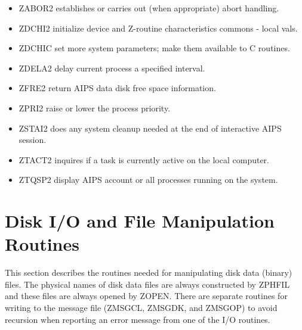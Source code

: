 \begin{itemize} %
\item ZABOR2  establishes or carries out (when
appropriate) abort handling.
\item ZDCHI2  initialize device and Z-routine
characteristics commons - local vals.
\item ZDCHIC  set more system parameters; make them
available to C routines.
\item ZDELA2  delay current process a specified
interval.
\item ZFRE2   return AIPS data disk free space
information.
\item ZPRI2   raise or lower the process priority.
\item ZSTAI2  does any system cleanup needed at the end
of interactive AIPS session.
\item ZTACT2  inquires if a task is currently active on
the local computer.
\item ZTQSP2  display AIPS account or all processes
running on the system.
\end{itemize} %


\section{Disk I/O and File Manipulation Routines }

This section describes the routines needed for manipulating disk data
(binary) files.  The physical names of disk data files are always
constructed by ZPHFIL and these files are always opened by ZOPEN.
There are separate routines for writing to the message file
(ZMSGCL, ZMSGDK, and ZMSGOP)
to avoid recursion when reporting an error message from one of the I/O
routines.


